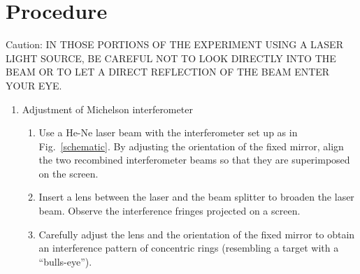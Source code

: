 \section{Procedure}

Caution: IN THOSE PORTIONS OF THE EXPERIMENT USING A LASER LIGHT 
SOURCE, BE CAREFUL NOT TO LOOK DIRECTLY INTO THE BEAM OR TO LET 
A DIRECT REFLECTION OF THE BEAM ENTER YOUR EYE.

\begin{enumerate}

\item Adjustment of Michelson interferometer

\begin{enumerate}
\item Use a He-Ne laser beam with the interferometer set up as 
in Fig.~\ref{schematic}. By adjusting the orientation of the fixed mirror, 
align the two recombined interferometer beams so that they are 
superimposed on the screen. 
\item Insert a lens between the laser and the beam splitter to 
broaden the laser beam. Observe the interference fringes projected 
on a screen.
\item Carefully adjust the lens and the orientation of the fixed 
mirror to obtain an interference pattern of concentric rings 
(resembling a target with a ``bulls-eye''). 
\end{enumerate}

%



 


\end{enumerate}
